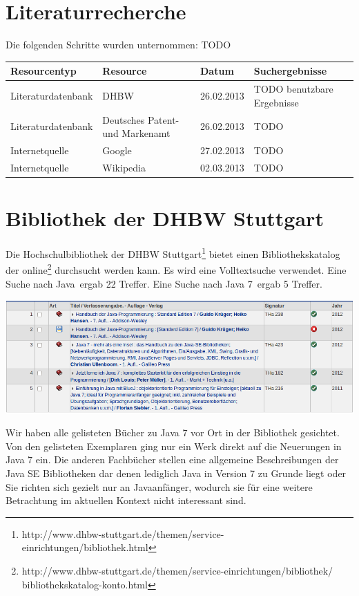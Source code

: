 \section{Literaturrecherche}
Die folgenden Schritte wurden unternommen: TODO

\renewcommand{\arraystretch}{1.5}
\begin{table}[htp]
\centering
\begin{tabular}{l|p{3.5cm}|l|p{3.5cm}}
Resourcentyp & Resource & Datum & Suchergebnisse\\
\hline
Literaturdatenbank & DHBW & 26.02.2013 & TODO benutzbare Ergebnisse\\
Literaturdatenbank & Deutsches Patent- und Markenamt & 26.02.2013 & TODO\\
Internetquelle & Google & 27.02.2013 & TODO\\
Internetquelle & Wikipedia & 02.03.2013 & TODO\\
\end{tabular}
\end{table}
\section{Bibliothek der DHBW Stuttgart}
Die Hochschulbibliothek der DHBW Stuttgart\footnote{http://www.dhbw-stuttgart.de/themen/service-einrichtungen/bibliothek.html} bietet einen Bibliothekskatalog der online\footnote{http://www.dhbw-stuttgart.de/themen/service-einrichtungen/bibliothek/\\bibliothekskatalog-konto.html} durchsucht werden kann. Es wird eine Volltextsuche verwendet. Eine Suche nach \glqq Java\grqq ~ergab 22 Treffer. Eine Suche nach \glqq Java 7\grqq ~ergab 5 Treffer.

\begin{center}
\includegraphics[width=\textwidth]{images/dhbw-lib-search-results.png}
\end{center}

Wir haben alle gelisteten Bücher zu Java 7 vor Ort in der Bibliothek gesichtet. Von den gelisteten Exemplaren ging nur ein Werk\cite{javainsel2} direkt auf die Neuerungen in Java 7 ein. Die anderen Fachbücher stellen eine allgemeine Beschreibungen der Java SE Bibliotheken dar denen lediglich Java in Version 7 zu Grunde liegt\cite{dhLibHandbuchJava} oder Sie richten sich gezielt nur an Javaanfänger\cite{dhLibJetztJavaLernen}\cite{dhLibBlueJStart}, wodurch sie für eine weitere Betrachtung im aktuellen Kontext nicht interessant sind.\\

